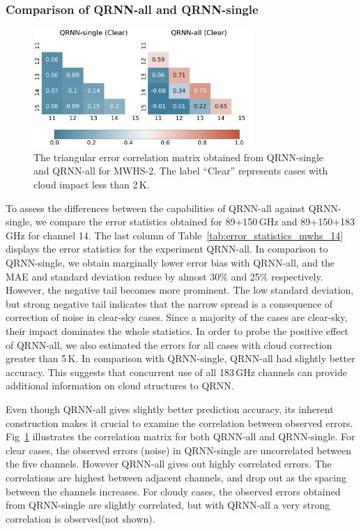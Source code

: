\documentclass[amt, manuscript]{copernicus}
\begin{document}
\subsubsection{Comparison of QRNN-all and QRNN-single}
%
\begin{figure}[t]
	\centering
	\includegraphics[height=45mm]{Figures/correlation.pdf} 
	\caption{ The triangular error correlation matrix obtained from QRNN-single and QRNN-all for MWHS-2. The label ``Clear'' represents cases with cloud impact less than 2\,K.}
	\label{fig:correlations_mwhs}	
\end{figure}
To assess the differences between the capabilities of QRNN-all against QRNN-single, we  compare the error statistics obtained for 89+150\,GHz and 89+150+183\,GHz for channel 14. The last column of Table~\ref{tab:error_statistics_mwhs_14} displays the error statistics for the experiment QRNN-all. In comparison to QRNN-single, we obtain marginally lower error bias with QRNN-all, and the MAE and standard deviation reduce by almost 30\% and 25\% respectively. However, the negative tail becomes more prominent. The low standard deviation, but strong negative tail indicates that the narrow spread is a consequence of correction of noise in clear-sky cases. Since a majority of the cases are clear-sky, their impact dominates the whole statistics. In order to probe the positive effect of QRNN-all, we also estimated the errors for all cases with cloud correction greater than 5\,K. In comparison with QRNN-single, QRNN-all had slightly better accuracy. This suggests that concurrent use of all 183\,GHz channels can provide additional information on cloud structures to QRNN. 

Even though QRNN-all gives slightly better prediction accuracy, its inherent construction makes it crucial to examine the correlation between observed errors. Fig~\ref{fig:correlations_mwhs} illustrates the correlation matrix for both QRNN-all and QRNN-single. For clear cases, the observed errors (noise) in QRNN-single are uncorrelated between the five channels. However QRNN-all gives out highly correlated errors. The correlations are highest between adjacent channels, and drop out as the spacing between the channels increases. For cloudy cases, the observed errors obtained from QRNN-single are slightly correlated, but with QRNN-all a very strong correlation is observed(not shown). 
\end{document}
